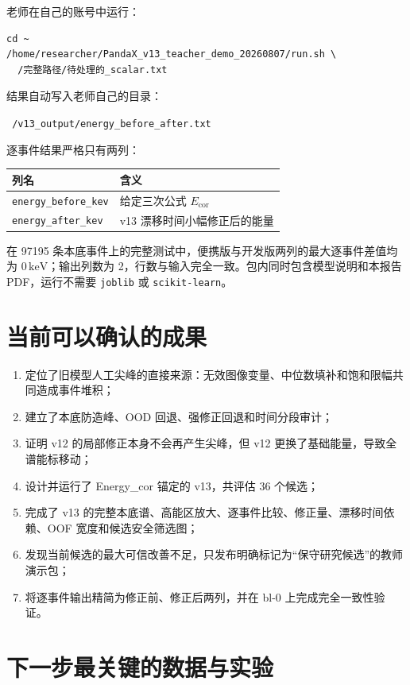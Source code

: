\documentclass[UTF8,11pt,a4paper]{ctexart}
\begin{document}
老师在自己的账号中运行：
\begin{verbatim}
cd ~
/home/researcher/PandaX_v13_teacher_demo_20260807/run.sh \
  /完整路径/待处理的_scalar.txt
\end{verbatim}

结果自动写入老师自己的目录：
\begin{center}
\texttt{\string~/v13\_output/energy\_before\_after.txt}
\end{center}

逐事件结果严格只有两列：
\begin{table}[H]
\centering
\begin{tabular}{ll}
\toprule
列名 & 含义\\
\midrule
\texttt{energy\_before\_kev} & 给定三次公式 $E_{\mathrm{cor}}$\\
\texttt{energy\_after\_kev} & v13 漂移时间小幅修正后的能量\\
\bottomrule
\end{tabular}
\end{table}

在 97195 条本底事件上的完整测试中，便携版与开发版两列的最大逐事件差值均为 $0\,\mathrm{keV}$；输出列数为 2，行数与输入完全一致。包内同时包含模型说明和本报告 PDF，运行不需要 \texttt{joblib} 或 \texttt{scikit-learn}。

\section{当前可以确认的成果}

\begin{enumerate}
  \item 定位了旧模型人工尖峰的直接来源：无效图像变量、中位数填补和饱和限幅共同造成事件堆积；
  \item 建立了本底防造峰、OOD 回退、强修正回退和时间分段审计；
  \item 证明 v12 的局部修正本身不会再产生尖峰，但 v12 更换了基础能量，导致全谱能标移动；
  \item 设计并运行了 Energy\_cor 锚定的 v13，共评估 36 个候选；
  \item 完成了 v13 的完整本底谱、高能区放大、逐事件比较、修正量、漂移时间依赖、OOF 宽度和候选安全筛选图；
  \item 发现当前候选的最大可信改善不足，只发布明确标记为“保守研究候选”的教师演示包；
  \item 将逐事件输出精简为修正前、修正后两列，并在 bl-0 上完成完全一致性验证。
\end{enumerate}

\section{下一步最关键的数据与实验}
\end{document}
